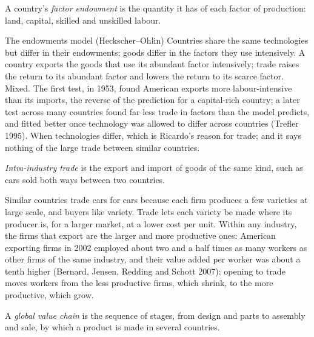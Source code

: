 \begin{definition}\label{def:g12:trade-and-trade-policy:endowment}
A country's \emph{factor endowment} is the quantity it has of each factor of production: land, capital, skilled and unskilled labour.
\end{definition}

\begin{model}{The endowments model (Heckscher--Ohlin)}
%
\assumes Countries share the same technologies but differ in their endowments; goods differ in the factors they use intensively.
\predicts A country exports the goods that use its abundant factor intensively; trade raises the return to its abundant factor and lowers the return to its scarce factor.
\tested Mixed. The first test, in 1953, found American exports more labour-intensive than its imports, the reverse of the prediction for a capital-rich country; a
  later test across many countries found far less trade in factors than the model predicts, and fitted better once technology was allowed to differ across countries
  (Trefler 1995).
\breaks When technologies differ, which is Ricardo's reason for trade; and it says nothing of the large trade between similar countries.
\end{model}

\begin{definition}\label{def:g12:trade-and-trade-policy:intra-industry}
\emph{Intra-industry trade} is the export and import of goods of the same kind, such as cars sold both ways between two countries.
\end{definition}

Similar countries trade cars for cars because each firm produces a few varieties at large scale, and buyers like variety. Trade lets each variety be made where its producer
is, for a larger market, at a lower cost per unit. Within any industry, the firms that export are the larger and more productive ones: American exporting firms in 2002 employed about two and a
half times as many workers as other firms of the same industry, and their value added per worker was about a tenth higher (Bernard, Jensen, Redding and Schott 2007);
 opening to trade moves workers from the
less productive firms, which shrink, to the more productive, which grow.

\begin{definition}\label{def:g12:trade-and-trade-policy:value-chain}
A \emph{global value chain} is the sequence of stages, from design and parts to assembly and sale, by which a product is made in several countries.
\end{definition}

